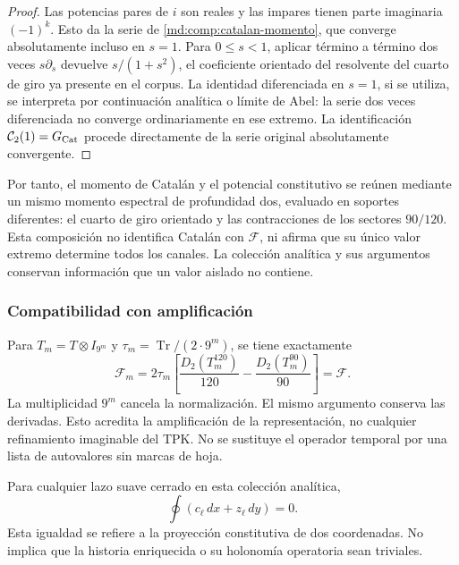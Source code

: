 \begin{proof}
Las potencias pares de \(i\) son reales y las impares tienen parte
imaginaria \((-1)^k\). Esto da la serie de
\eqref{md:comp:catalan-momento}, que converge absolutamente incluso
en \(s=1\). Para \(0\leq s<1\), aplicar término a término dos veces
\(s\partial_s\) devuelve \(s/(1+s^2)\), el coeficiente orientado del
resolvente del cuarto de giro ya presente en el corpus.
La identidad diferenciada en \(s=1\), si se utiliza, se interpreta
por continuación analítica o límite de Abel: la serie dos veces
diferenciada no converge ordinariamente en ese extremo.
La identificación \(\mathcal C_2(1)=G_{\rm Cat}\) procede directamente
de la serie original absolutamente convergente.
\end{proof}

Por tanto, el momento de Catalán y el potencial constitutivo se reúnen
mediante un mismo momento espectral de profundidad dos, evaluado en
soportes diferentes: el cuarto de giro orientado y las contracciones
de los sectores \(90/120\). Esta composición no identifica Catalán
con \(\mathscr F\), ni afirma que su único valor extremo determine
todos los canales. La colección analítica y sus argumentos conservan
información que un valor aislado no contiene.

\subsubsection{Compatibilidad con amplificación}
\label{md:comp:amplificacion-potencial}

Para \(T_m=T\otimes I_{9^m}\) y
\(\tau_m=\operatorname{Tr}/(2\cdot9^m)\), se tiene exactamente
\begin{equation}
 \mathscr F_m=2\tau_m\left[
 \frac{D_2(T_m^{120})}{120}
 -\frac{D_2(T_m^{90})}{90}\right]=\mathscr F.
 \label{md:comp:potencial-amplificado}
\end{equation}
La multiplicidad \(9^m\) cancela la normalización. El mismo argumento
conserva las derivadas. Esto acredita la amplificación de la
representación, no cualquier refinamiento imaginable del TPK.
No se sustituye el operador temporal por una lista de autovalores
sin marcas de hoja.

Para cualquier lazo suave cerrado en esta colección analítica,
\begin{equation}
 \oint(c_\ell\,dx+z_\ell\,dy)=0.
 \label{md:comp:integral-cerrada}
\end{equation}
Esta igualdad se refiere a la proyección constitutiva de dos
coordenadas. No implica que la historia enriquecida o su holonomía
operatoria sean triviales.

